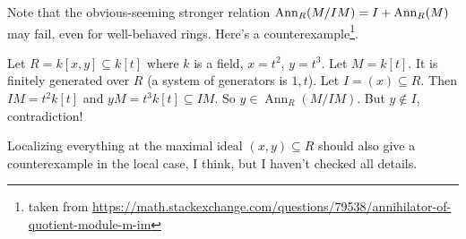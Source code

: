 \documentclass[a4paper,parskip=half,numbers=enddot, DIV=12, headheight=30pt]{scrreprt}
\begin{document}
\begin{rem*}
	Note that the obvious-seeming stronger relation $\operatorname{Ann}_R(M/IM)=I+\operatorname{Ann}_R(M)$ may fail, even for well-behaved rings. Here's a counterexample\footnote{taken from \url{https://math.stackexchange.com/questions/79538/annihilator-of-quotient-module-m-im}}.
	
	 Let $R=k[x,y]\subseteq k[t]$ where $k$ is a field, $x=t^2$, $y=t^3$. Let $M=k[t]$. It is finitely generated over $R$ (a system of generators is $1, t$). 
	Let $I=(x)\subseteq R$. Then $IM=t^2k[t]$ and $yM=t^3k[t]\subseteq IM$. So $y\in \operatorname{Ann}_R(M/IM)$. But $y\notin I$, contradiction! 
	
	Localizing everything at the maximal ideal $(x,y)\subseteq R$ should also give a counterexample in the local case, I think, but I haven't checked all details.
\end{rem*}
\end{document}
